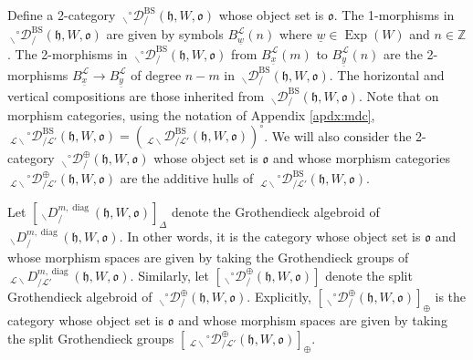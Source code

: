 \documentclass{amsart}
\newcommand{\Z}{\mathbb{Z}}
\newcommand{\scrL}{\mathcal{L}}
\newcommand{\fr}[1]{\mathfrak{#1}}
\DeclareMathOperator{\diag}{diag}
\DeclareMathOperator{\BS}{BS}
\newcommand{\EWmon}[2]{\:_{#1 \backslash} \mathcal{D}_{/ #2} }
\newcommand{\grEWmon}[2]{\:_{#1 \backslash} \!\! {}^{\circ} \mathcal{D}_{/ #2} }
\newcommand{\DDBE}[2]{\:_{#1 \backslash} D_{/ #2}^{m, \diag}}
\DeclareMathOperator{\Exp}{Exp}
\newcommand{\uw}{\underline{w}}
\newcommand{\ux}{\underline{x}}
\newcommand{\uy}{\underline{y}}
\theoremstyle{definition}
\numberwithin{equation}{subsection}
\begin{document}
Define a 2-category $\grEWmon{}{}^{\BS} (\fr{h}, W, \fr{o})$ whose object set is $\fr{o}$.
The 1-morphisms in $\grEWmon{}{}^{\BS} (\fr{h}, W, \fr{o})$ are given by symbols $B_{\uw}^{\scrL} (n)$ where $\uw \in \Exp (W)$ and $n \in \Z$.
The 2-morphisms in $\grEWmon{}{}^{\BS} (\fr{h}, W, \fr{o})$ from $B_{\ux}^{\scrL} (m)$ to $B_{\uy}^{\scrL} (n)$ are the 2-morphisms $B_{\ux}^{\scrL} \to B_{\uy}^{\scrL}$ of degree $n-m$ in $\EWmon{}{}^{\BS} (\fr{h}, W, \fr{o})$.
The horizontal and vertical compositions are those inherited from $\EWmon{}{}^{\BS} (\fr{h}, W, \fr{o})$. Note that on morphism categories, using the notation of Appendix \ref{apdx:mdc}, $\grEWmon{\scrL}{\scrL'}^{\BS} (\fr{h}, W, \fr{o}) = \left( \EWmon{\scrL}{\scrL'}^{\BS} (\fr{h}, W, \fr{o})\right)^{\circ}$.
We will also consider the 2-category $\grEWmon{}{}^{\oplus} (\fr{h}, W, \fr{o})$ whose object set is $\fr{o}$ and whose morphism categories $\grEWmon{\scrL}{\scrL'}^{\oplus} (\fr{h}, W, \fr{o})$ are the additive hulls of $\grEWmon{\scrL}{\scrL'}^{\BS} (\fr{h}, W, \fr{o})$.

Let $[\DDBE{}{} (\fr{h}, W, \fr{o}) ]_{\Delta}$ denote the Grothendieck algebroid of $\DDBE{}{} (\fr{h}, W, \fr{o})$. In other words, it is the category whose object set is $\fr{o}$ and whose morphism spaces are given by taking the Grothendieck groups of $\DDBE{\scrL}{\scrL'} (\fr{h}, W, \fr{o})$.
Similarly, let $[\grEWmon{}{}^{\oplus} (\fr{h}, W, \fr{o})]$ denote the split Grothendieck algebroid of $\grEWmon{}{}^{\oplus} (\fr{h}, W, \fr{o})$. Explicitly, $[\grEWmon{}{}^{\oplus} (\fr{h}, W, \fr{o})]_{\oplus}$ is the category whose object set is $\fr{o}$ and whose morphism spaces are given by taking the split Grothendieck groups $[\grEWmon{\scrL}{\scrL'}^{\oplus} (\fr{h}, W, \fr{o})]_{\oplus}$.
\end{document}
